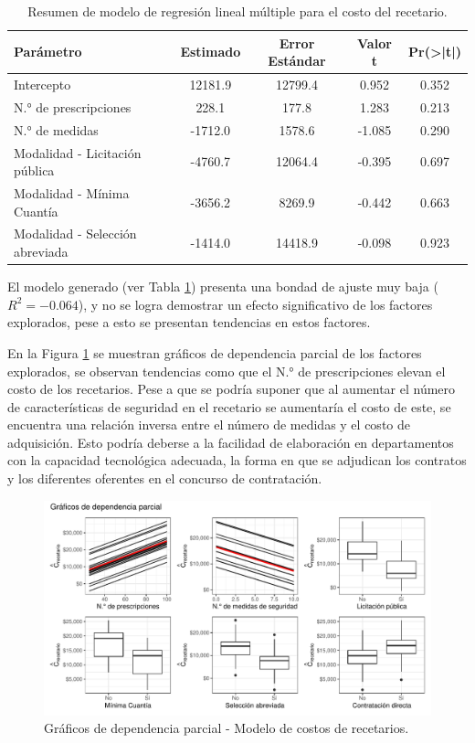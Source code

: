 \documentclass[
]{book}
\begin{document}
\begin{table}

\caption{\label{tab:resumenModeloRegresionLineal}Resumen de modelo de regresión lineal múltiple para el costo del recetario.}
\centering
\begin{tabular}[t]{lcccc}
\toprule
Parámetro & Estimado & Error Estándar & Valor t & Pr(>|t|)\\
\midrule
Intercepto & 12181.9 & 12799.4 & 0.952 & 0.352\\
N.° de prescripciones & 228.1 & 177.8 & 1.283 & 0.213\\
N.° de medidas & -1712.0 & 1578.6 & -1.085 & 0.290\\
Modalidad - Licitación pública & -4760.7 & 12064.4 & -0.395 & 0.697\\
Modalidad - Mínima Cuantía & -3656.2 & 8269.9 & -0.442 & 0.663\\
\addlinespace
Modalidad - Selección abreviada & -1414.0 & 14418.9 & -0.098 & 0.923\\
\bottomrule
\end{tabular}
\end{table}

El modelo generado (ver Tabla \ref{tab:resumenModeloRegresionLineal}) presenta una bondad de ajuste muy baja (\(R^{2} = -0.064\)), y no se logra demostrar un efecto significativo de los factores explorados, pese a esto se presentan tendencias en estos factores.

En la Figura \ref{fig:DependParcial1} se muestran gráficos de dependencia parcial de los factores explorados, se observan tendencias como que el N.° de prescripciones elevan el costo de los recetarios. Pese a que se podría suponer que al aumentar el número de características de seguridad en el recetario se aumentaría el costo de este, se encuentra una relación inversa entre el número de medidas y el costo de adquisición. Esto podría deberse a la facilidad de elaboración en departamentos con la capacidad tecnológica adecuada, la forma en que se adjudican los contratos y los diferentes oferentes en el concurso de contratación.

\begin{figure}

{\centering \includegraphics[width=0.9\linewidth]{InformeFinal_files/figure-latex/DependParcial1-1} 

}

\caption{Gráficos de dependencia parcial - Modelo de costos de recetarios.}\label{fig:DependParcial1}
\end{figure}
\end{document}
